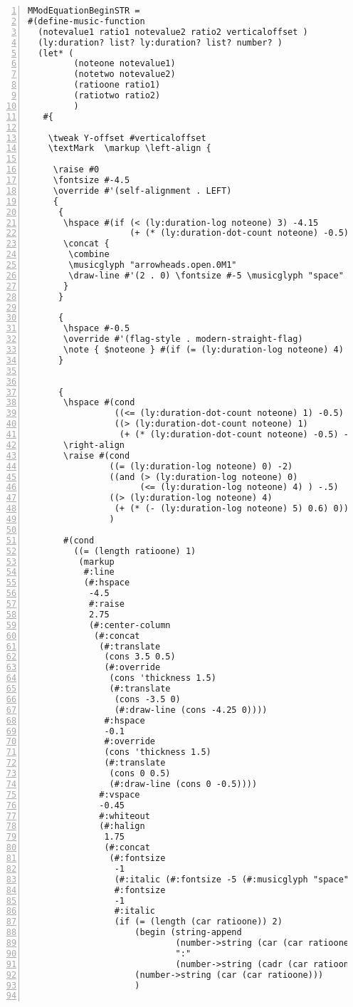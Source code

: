\begin{Verbatim}[numbers=left,xleftmargin=5mm]
MModEquationBeginSTR =
#(define-music-function
  (notevalue1 ratio1 notevalue2 ratio2 verticaloffset )
  (ly:duration? list? ly:duration? list? number? )
  (let* (
         (noteone notevalue1)
         (notetwo notevalue2)
         (ratioone ratio1)
         (ratiotwo ratio2)
         )
   #{

    \tweak Y-offset #verticaloffset
    \textMark  \markup \left-align {

     \raise #0
     \fontsize #-4.5
     \override #'(self-alignment . LEFT)
     {
      {
       \hspace #(if (< (ly:duration-log noteone) 3) -4.15
                    (+ (* (ly:duration-dot-count noteone) -0.5) -4.5))
       \concat {
        \combine
        \musicglyph "arrowheads.open.0M1"
        \draw-line #'(2 . 0) \fontsize #-5 \musicglyph "space"
       }
      }

      {
       \hspace #-0.5
       \override #'(flag-style . modern-straight-flag)
       \note { $noteone } #(if (= (ly:duration-log noteone) 4) 1 1 )
      }


      {
       \hspace #(cond
                 ((<= (ly:duration-dot-count noteone) 1) -0.5)
                 ((> (ly:duration-dot-count noteone) 1)
                  (+ (* (ly:duration-dot-count noteone) -0.5) -0.25)))
       \right-align
       \raise #(cond
                ((= (ly:duration-log noteone) 0) -2)
                ((and (> (ly:duration-log noteone) 0)
                      (<= (ly:duration-log noteone) 4) ) -.5)
                ((> (ly:duration-log noteone) 4)
                 (+ (* (- (ly:duration-log noteone) 5) 0.6) 0))
                )

       #(cond
         ((= (length ratioone) 1)
          (markup
           #:line
           (#:hspace
            -4.5
            #:raise
            2.75
            (#:center-column
             (#:concat
              (#:translate
               (cons 3.5 0.5)
               (#:override
                (cons 'thickness 1.5)
                (#:translate
                 (cons -3.5 0)
                 (#:draw-line (cons -4.25 0))))
               #:hspace
               -0.1
               #:override
               (cons 'thickness 1.5)
               (#:translate
                (cons 0 0.5)
                (#:draw-line (cons 0 -0.5))))
              #:vspace
              -0.45
              #:whiteout
              (#:halign
               1.75
               (#:concat
                (#:fontsize
                 -1
                 (#:italic (#:fontsize -5 (#:musicglyph "space")))
                 #:fontsize
                 -1
                 #:italic
                 (if (= (length (car ratioone)) 2)
                     (begin (string-append
                             (number->string (car (car ratioone)))
                             ":"
                             (number->string (cadr (car ratioone))))  )
                     (number->string (car (car ratioone)))
                     )


\end{Verbatim}

